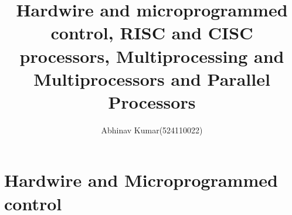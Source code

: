 \documentclass{article}
\title{Hardwire and microprogrammed control, RISC and CISC processors, Multiprocessing and Multiprocessors and Parallel Processors}
\author{Abhinav Kumar(524110022)}
\begin{document}
\maketitle
\newpage
\section*{Hardwire and Microprogrammed control}
\end{document}
